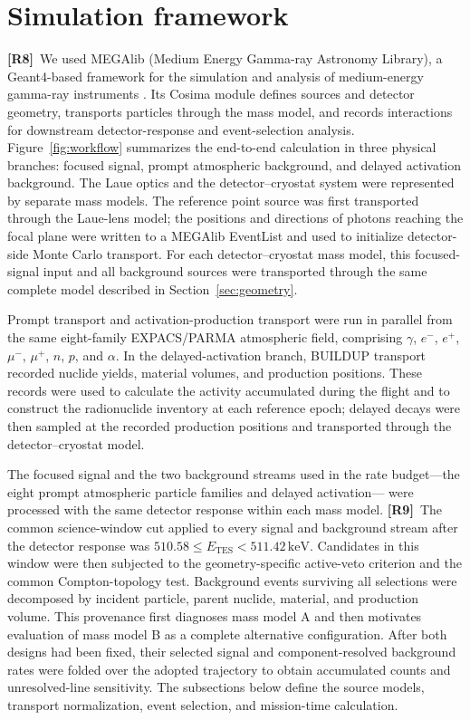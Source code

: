 \documentclass[11pt]{article}
\newcommand{\revmark}[1]{\textcolor{revisionblue}{\textbf{[R#1]}}\ }
\newcommand{\revblue}[1]{\textcolor{revisionblue}{#1}}
\newcommand{\keV}{\ensuremath{\,\mathrm{keV}}}
\begin{document}
\FloatBarrier

\section{Simulation framework}
\label{sec:framework}

\revmark{8}We used MEGAlib (Medium Energy Gamma-ray Astronomy Library), a
Geant4-based framework for the simulation and analysis of medium-energy
gamma-ray instruments \cite{Zoglauer2006,Agostinelli2003,Allison2016}. Its
Cosima module defines sources and detector geometry, transports particles
through the mass model, and records interactions for downstream detector-response
and event-selection analysis. Figure~\ref{fig:workflow} summarizes the end-to-end
calculation in three physical branches: focused signal, prompt atmospheric
background, and delayed activation background. The Laue optics and the
detector--cryostat system were represented by separate mass models. The
reference point source was first transported through the Laue-lens model; the
positions and directions of photons reaching the focal plane were written to a
MEGAlib EventList and used to initialize detector-side Monte Carlo transport.
For each detector--cryostat mass model, this focused-signal input and all
background sources were transported through the same complete model described
in Section~\ref{sec:geometry}.

Prompt transport and activation-production transport were run in parallel from
the same \revblue{eight-family EXPACS/PARMA atmospheric field, comprising
$\gamma$, $e^-$, $e^+$, $\mu^-$, $\mu^+$, $n$, $p$, and $\alpha$}. In
the delayed-activation branch, BUILDUP transport recorded nuclide yields,
material volumes, and production positions. These records were used to
calculate the activity accumulated during the flight and to construct the
radionuclide inventory at each reference epoch; delayed decays were then
sampled at the recorded production positions and transported through the
detector--cryostat model.

The focused signal and the \revblue{two background streams used in the rate
budget---the eight prompt atmospheric particle families and delayed
activation---} were processed with the same detector response within each
mass model. \revmark{9}The common science-window cut applied to every signal and
background stream after the detector response was
$510.58\leq E_{\mathrm{TES}}<511.42\keV$. Candidates in this window were then
subjected to the geometry-specific active-veto criterion and the common
Compton-topology test. Background events surviving all selections were
decomposed by incident particle, parent
nuclide, material, and production volume. This provenance first diagnoses mass
model A and then motivates evaluation of mass model B as a complete alternative
configuration. After both designs had been fixed, their selected signal and
component-resolved background rates were folded over the adopted trajectory to
obtain accumulated counts and unresolved-line sensitivity. The subsections
below define the source models, transport normalization, event selection, and
mission-time calculation.
\end{document}
